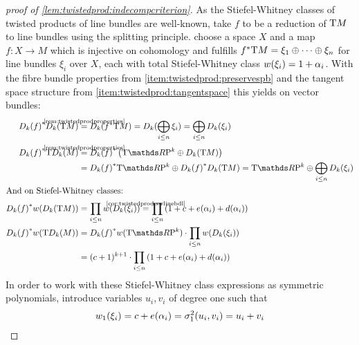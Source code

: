 \begin{proof}[proof of \autoref{lem:twistedprod:indecompcriterion}]
  As the Stiefel-Whitney classes of twisted products of line bundles
  are well-known, take $f$ to be a reduction of $\mathrm{T}M$ to line bundles
  using the splitting principle.
  \Idest choose a space $X$ and a map $f\colon X\to M$ which is
  injective on cohomology and fulfills
  ${f}^* \mathrm{T}M = \xi_1\oplus\dotsb\oplus\xi_n$ for line bundles
  $\xi_i$ over $X$, each with total Stiefel-Whitney class
  ${w}(\xi_i)=1+\alpha_i$.
  With the fibre bundle properties from
  \ref{item:twistedprod:preservespb}
  and the tangent space structure from
  \ref{item:twistedprod:tangentspace}
  this yields on vector bundles:
  \begin{align*}
    \pb{\Twistedprod{k}{f}} \Twistedprod{k}{\T M}
    &\cequalsby{\autoref{rem:twistedprodproperties}}
      \Twistedprod{k}{\pb f \T M}
      = \Twistedprod{k}{\bigoplus_{i\leq n}\xi_i}
      = \bigoplus_{i\leq n}\Twistedprod{k}{\xi_i}
    \\
    \pb{\Twistedprod{k}{f}} \T{\Twistedprod{k}{M}}
    &\cequalsby{\autoref{rem:twistedprodproperties}}
      \pb{\Twistedprod{k}{f}} \left(
      \T{\RP k} \oplus \Twistedprod{k}{\T M}
      \right)\\
    &= \pb{\Twistedprod{k}{f}} \T{\RP k}
      \oplus
      \pb{\Twistedprod{k}{f}} \Twistedprod{k}{\T M}
      = \T{\RP k} \oplus \bigoplus_{i\leq n}\Twistedprod{k}{\xi_i}\\
    \intertext{And on Stiefel-Whitney classes:}
    \pb{\Twistedprod{k}{f}} \W{\Twistedprod{k}{\T M}}
    &= \prod_{i\leq n} \W{\Twistedprod{k}{\xi_i}}
      \cequalsby{\autoref{cor:twistedprod:swlinebdl}}
      \prod_{i\leq n} \left(1 + c + e(\alpha_i) + d(\alpha_i)\right)
    \\
    \pb{\Twistedprod{k}{f}} \W{\T\Twistedprod{k}{M}}
    &= \pb{\Twistedprod{k}{f}}\W{\T{\RP k}}
      \cdot \prod_{i\leq n} \W{\Twistedprod{k}{\xi_i}} \\
    &= (c+1)^{k+1}
      \cdot \prod_{i\leq n} \left(1+c+e(\alpha_i)+d(\alpha_i)\right)
  \end{align*}
  In order to work with these Stiefel-Whitney class expressions as
  symmetric polynomials, introduce variables $u_i, v_i$ of degree
  one such that
  \begin{align*}
    \w1{\xi_i} &= c+e(\alpha_i) = \el 1 2(u_i, v_i) = u_i+v_i \\

\end{align*}
\end{proof}
